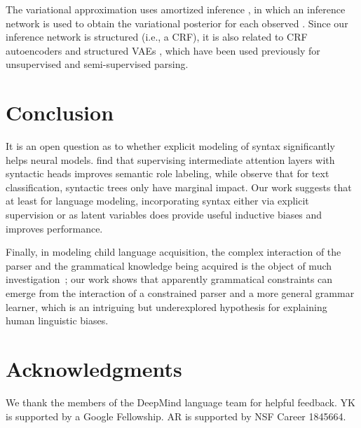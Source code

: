 \documentclass[11pt,a4paper]{article}
\begin{document}
The variational approximation uses amortized inference \cite{kingma2014vae,mnih2014neural,rezende2014vae}, in which an inference network is used to obtain
the variational posterior for each observed . Since our inference network is structured (i.e., a CRF), it is also related to CRF autoencoders \cite{ammar2014crf} and structured VAEs \cite{johnson2016composing,krishnan2017struct}, which have been used previously for unsupervised \cite{cai2017crf,drozdov2018latent,li2019grammar} and semi-supervised \cite{yin2018structvae,corro2018semi} parsing.
\vspace{-2mm}
\section{Conclusion}
\vspace{-2mm}
It is an open question as to whether explicit modeling of syntax significantly helps  neural models. \citet{strubell2018srl} find that supervising intermediate attention layers with syntactic heads improves semantic role labeling, while \citet{shi2018tree} observe that
for text classification, syntactic trees only have marginal impact. Our work suggests that at least for language modeling, incorporating syntax either via explicit supervision  or as latent variables  does provide useful inductive biases and improves performance. 

Finally, in modeling child language acquisition, the complex interaction of the parser and the grammatical knowledge being acquired is the object of much investigation~\cite{trueswell:2007}; our work shows that apparently grammatical constraints can emerge from the interaction of a constrained parser and a more general grammar learner, which is an intriguing but underexplored hypothesis for explaining human linguistic biases.

{\small
\vspace{-1.5mm}
\section*{Acknowledgments}
\vspace{-1.5mm}
We thank the members of the DeepMind language team for helpful feedback. YK is supported by a Google Fellowship. AR is supported by NSF Career 1845664. }
{
\small


}
\end{document}
